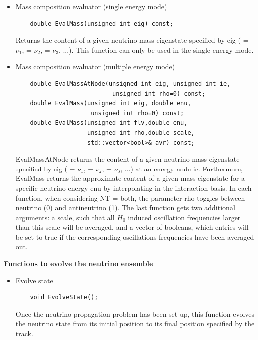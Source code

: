 \documentclass[3p,12pt]{elsarticle}
\newcommand{\ttf}{\ttfamily}
\begin{document}
\begin{itemize}
\item Mass composition evaluator (single energy mode)
  \begin{lstlisting}
    double EvalMass(unsigned int eig) const;
  \end{lstlisting}
Returns the content of a given neutrino mass eigenstate specified by {\ttfamily eig} ({ = $\nu_1$}, { = $\nu_2$}, { = $\nu_3$, ...}). This function can only be used in the single energy mode.
\item Mass composition evaluator (multiple energy mode)
  \begin{lstlisting}
    double EvalMassAtNode(unsigned int eig, unsigned int ie,
                           unsigned int rho=0) const;
    double EvalMass(unsigned int eig, double enu,
                     unsigned int rho=0) const;
    double EvalMass(unsigned int flv,double enu,
                    unsigned int rho,double scale,
                    std::vector<bool>& avr) const;
  \end{lstlisting}
{\ttfamily EvalMassAtNode} returns the content of a given neutrino mass
eigenstate specified by {\ttfamily eig} ({ = $\nu_1$},
{ = $\nu_2$}, { = $\nu_3$, ...}) at an energy
node {\ttfamily ie}. Furthermore, {\ttfamily EvalMass} returns the
approximate content of a given mass eigenstate for a specific neutrino
energy  {\ttf enu} by interpolating in the interaction basis. In each
function, when considering  {\ttf  NT = both}, the parameter {\ttf
  rho} toggles between {\ttf neutrino (0)} and {\ttf antineutrino
  (1)}. The last function gets two additional arguments: a {\ttf scale}, such
that all $H_0$ induced oscillation frequencies larger than this scale
will be averaged, and a vector of booleans, which entries will be set to
true if the corresponding oscillations frequencies have been averaged
out.
\end{itemize}

\textbf{Functions to evolve the neutrino ensemble}

\begin{itemize}
\item Evolve state
  \begin{lstlisting}
    void EvolveState();
  \end{lstlisting}
Once the neutrino propagation problem has been set up, this function
evolves the neutrino state from its initial position to its final
position specified by the {\ttfamily track}. 
\end{itemize}
\end{document}

